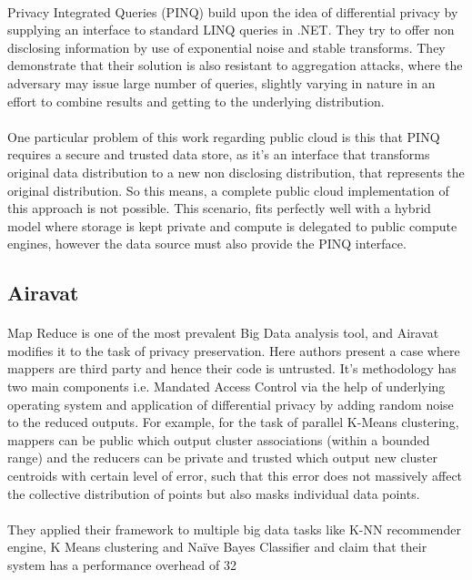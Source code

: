 \documentclass{report}
\begin{document}
\paragraph{}
Privacy Integrated Queries (PINQ) \cite{mcsherry2009privacy} build upon the idea of differential privacy by supplying an interface to standard LINQ queries in .NET. They try to offer non disclosing information by use of exponential noise and stable transforms. They demonstrate that their solution is also resistant to aggregation attacks, where the adversary may issue large number of queries, slightly varying in nature in an effort to combine results and getting to the underlying distribution.
\paragraph{}
One particular problem of this work regarding public cloud is this that PINQ requires a secure and trusted data store, as it’s an interface that transforms original data distribution to a new non disclosing distribution, that represents the original distribution. So this means, a complete public cloud implementation of this approach is not possible. This scenario, fits perfectly well with a hybrid model where storage is kept private and compute is delegated to public compute engines, however the data source must also provide the PINQ interface.
\subsection{Airavat}
\paragraph{}
Map Reduce is one of the most prevalent Big Data analysis tool, and Airavat \cite{roy2010airavat} modifies it to the task of privacy preservation. Here authors present a case where mappers are third party and hence their code is untrusted. It's methodology has two main components i.e. Mandated Access Control via the help of underlying operating system and application of differential privacy by adding random noise to the reduced outputs. For example, for the task of parallel K-Means clustering, mappers can be public which output cluster associations (within a bounded range) and the reducers can be private and trusted which output new cluster centroids with certain level of error, such that this error does not massively affect the collective distribution of points but also masks individual data points.
\paragraph{}
They applied their framework to multiple big data tasks like K-NN recommender engine, K Means clustering and Naïve Bayes Classifier and claim that their system has a performance overhead of 32%
\end{document}
